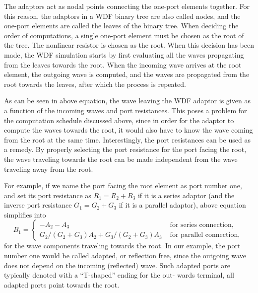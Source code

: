 \documentclass[10pt,a4paper,oneside]{article}
\begin{document}
The adaptors act as nodal points connecting the one-port elements together. For this reason, the adaptors in a WDF binary tree are also called nodes, and the one-port elements are called the leaves of the binary tree. When deciding the order of computations, a single one-port element must be chosen as the root of the tree. The nonlinear resistor is chosen as the root. When this decision has been made, the WDF simulation starts by first evaluating all the waves propagating from the leaves towards the root. When the incoming wave arrives at the root element, the outgoing wave is computed, and the waves are propagated from the root towards the leaves, after which the process is repeated.

As can be seen in above equation, the wave leaving the WDF adaptor is given as a function of the incoming waves and port resistances. This poses a problem for the computation schedule discussed above, since in order for the adaptor to compute the waves towards the root, it would also have to know the wave coming from the root at the same time. Interestingly, the port resistances can be used as a remedy. By properly selecting the port resistance for the port facing the root, the wave traveling towards the root can be made independent from the wave traveling away from the root.

For example, if we name the port facing the root element as port number one, and set its port resistance as $R_1 = R_2 + R_3$ if it is a series adaptor (and the inverse port resistance $G_1 = G_2 + G_3$ if it is a parallel adaptor), above equation simplifies into
\[
B_{1}=\left\{\begin{array}{ll}{-A_{2}-A_{3}} & {\text { for series connection, }} \\ {G_{2} /\left(G_{2}+G_{3}\right) A_{2}+G_{3} /\left(G_{2}+G_{3}\right) A_{3}} & {\text { for parallel connection, }}\end{array}\right.
\]
for the wave components traveling towards the root. In our example, the port number one would be called adapted, or reflection free, since the outgoing wave does not depend on the incoming
(reflected) wave. Such adapted ports are typically denoted with a “T-shaped” ending for the out- wards terminal, all adapted ports point towards the root.
\end{document}
